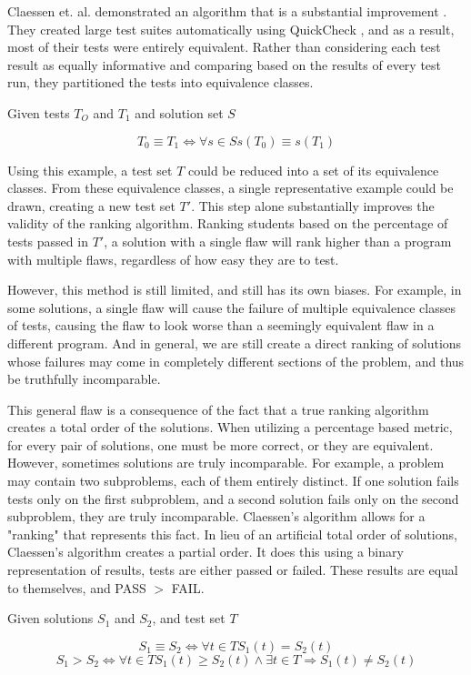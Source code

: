 \documentclass[11pt,twoside]{article}
\let\cite=\citep
\begin{document}
Claessen et. al. demonstrated an algorithm that is a substantial improvement \cite{Claessen}. They created large test suites automatically using QuickCheck \cite{QuickCheck}, and as a result, most of their tests were entirely equivalent. Rather than considering each test result as equally informative and comparing based on the results of every test run, they partitioned the tests into equivalence classes.

\centerline{ Given tests $T_O$ and $T_1$ and solution set $S$}
$$ T_0 \equiv T_1 \iff \forall s \in S s(T_0) \equiv s(T_1) $$

Using this example, a test set $T$ could be reduced into a set of its equivalence classes. From these equivalence classes, a single representative example could be drawn, creating a new test set $T'$. This step alone substantially improves the validity of the ranking algorithm. Ranking students based on the percentage of tests passed in $T'$, a solution with a single flaw will rank higher than a program with multiple flaws, regardless of how easy they are to test.

However, this method is still limited, and still has its own biases. For example, in some solutions, a single flaw will cause the failure of multiple equivalence classes of tests, causing the flaw to look worse than a seemingly equivalent flaw in a different program. And in general, we are still create a direct ranking of solutions whose failures may come in completely different sections of the problem, and thus be truthfully incomparable.

This general flaw is a consequence of the fact that a true ranking algorithm creates a total order of the solutions. When utilizing a percentage based metric, for every pair of solutions, one must be more correct, or they are equivalent. However, sometimes solutions are truly incomparable. For example, a problem may contain two subproblems, each of them entirely distinct. If one solution fails tests only on the first subproblem, and a second solution fails only on the second subproblem, they are truly incomparable. Claessen's algorithm allows for a "ranking" that represents this fact. In lieu of an artificial total order of solutions, Claessen's algorithm creates a partial order. It does this using a binary representation of results, tests are either passed or failed. These results are equal to themselves, and PASS $>$ FAIL.

\centerline{Given solutions $S_1$ and $S_2$, and test set $T$}
$$S_1 \equiv S_2 \iff \forall t \in T S_1(t) = S_2(t)$$
$$S_1 > S_2 \iff \forall t \in T S_1(t) \geq S_2(t) \wedge \exists t \in T \Rightarrow S_1(t) \neq S_2(t)$$
\end{document}
